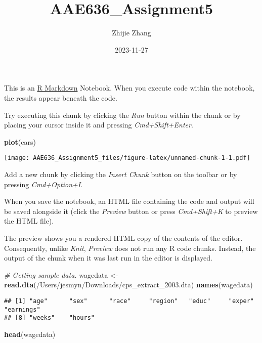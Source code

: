 \documentclass[
]{article}
\title{AAE636\_Assignment5}
\author{Zhijie Zhang}
\date{2023-11-27}
\newenvironment{Shaded}{\begin{snugshade}}{\end{snugshade}}
\newcommand{\CommentTok}[1]{\textcolor[rgb]{0.56,0.35,0.01}{\textit{#1}}}
\newcommand{\FunctionTok}[1]{\textcolor[rgb]{0.13,0.29,0.53}{\textbf{#1}}}
\newcommand{\NormalTok}[1]{#1}
\newcommand{\OtherTok}[1]{\textcolor[rgb]{0.56,0.35,0.01}{#1}}
\newcommand{\StringTok}[1]{\textcolor[rgb]{0.31,0.60,0.02}{#1}}
\begin{document}
\maketitle

This is an \href{http://rmarkdown.rstudio.com}{R Markdown} Notebook.
When you execute code within the notebook, the results appear beneath
the code.

Try executing this chunk by clicking the \emph{Run} button within the
chunk or by placing your cursor inside it and pressing
\emph{Cmd+Shift+Enter}.

\begin{Shaded}
\begin{Highlighting}[]
\FunctionTok{plot}\NormalTok{(cars)}
\end{Highlighting}
\end{Shaded}

\texttt{[image: AAE636\_Assignment5\_files/figure-latex/unnamed-chunk-1-1.pdf]}

Add a new chunk by clicking the \emph{Insert Chunk} button on the
toolbar or by pressing \emph{Cmd+Option+I}.

When you save the notebook, an HTML file containing the code and output
will be saved alongside it (click the \emph{Preview} button or press
\emph{Cmd+Shift+K} to preview the HTML file).

The preview shows you a rendered HTML copy of the contents of the
editor. Consequently, unlike \emph{Knit}, \emph{Preview} does not run
any R code chunks. Instead, the output of the chunk when it was last run
in the editor is displayed.

\begin{Shaded}
\begin{Highlighting}[]
\CommentTok{\# Getting sample data.}
\NormalTok{wagedata }\OtherTok{\textless{}{-}} \FunctionTok{read.dta}\NormalTok{(}\StringTok{\textquotesingle{}/Users/jesmyn/Downloads/cps\_extract\_2003.dta\textquotesingle{}}\NormalTok{)}
\FunctionTok{names}\NormalTok{(wagedata)}
\end{Highlighting}
\end{Shaded}

\begin{verbatim}
## [1] "age"      "sex"      "race"     "region"   "educ"     "exper"    "earnings"
## [8] "weeks"    "hours"
\end{verbatim}

\begin{Shaded}
\begin{Highlighting}[]
\FunctionTok{head}\NormalTok{(wagedata)}
\end{Highlighting}
\end{Shaded}
\end{document}
